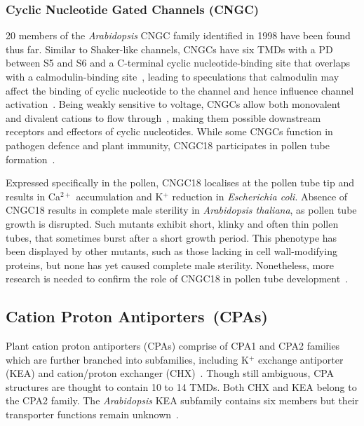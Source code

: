 \documentclass[11pt]{article}
\begin{document}
\begin{multicols*}{2}
\subsubsection{Cyclic Nucleotide Gated Channels (CNGC)}
20 members of the \textit{Arabidopsis} CNGC family identified in 1998 have been found thus far. Similar to Shaker-like channels, CNGCs have six TMDs with a PD between S5 and S6 and a C-terminal cyclic nucleotide-binding site that overlaps with a calmodulin-binding site~\citep{Demidchik2002}, leading to speculations that calmodulin may affect the binding of cyclic nucleotide to the channel and hence influence channel activation~\citep{Arazi2000}. Being weakly sensitive to voltage, CNGCs allow both monovalent and divalent cations to flow through~\citep{Talke2003}, making them possible downstream receptors and effectors of cyclic nucleotides. While some CNGCs function in pathogen defence and plant immunity, CNGC18 participates in pollen tube formation~\citep{Dietrich2010}. 

Expressed specifically in the pollen, CNGC18 localises at the pollen tube tip and results in Ca$^{2+}$ accumulation and K$^{+}$ reduction in \textit{Escherichia coli}. Absence of CNGC18 results in complete male sterility in \textit{Arabidopsis thaliana}, as pollen tube growth is disrupted. Such mutants exhibit short, klinky and often thin pollen tubes, that sometimes burst after a short growth period. This phenotype has been displayed by other mutants, such as those lacking in cell wall-modifying proteins, but none has yet caused complete male sterility. Nonetheless, more research is needed to confirm the role of CNGC18 in pollen tube development~\citep{Frietsch2007}.

\subsection{Cation Proton Antiporters~(CPAs)}
Plant cation proton antiporters (CPAs) comprise of CPA1 and CPA2 families which are further branched into subfamilies, including K$^{+}$ exchange antiporter (KEA) and cation/proton exchanger (CHX)~\citep{Maser2001}. Though still ambiguous, CPA structures are thought to contain 10 to 14 TMDs. Both CHX and KEA belong to the CPA2 family. The \textit{Arabidopsis} KEA subfamily contains six members but their transporter functions remain unknown~\citep{Chen2008}. 


\end{multicols*}
\end{document}
